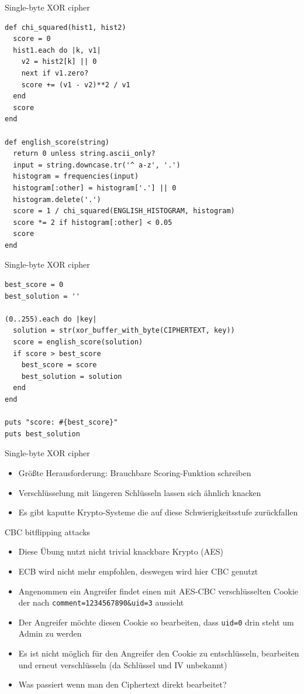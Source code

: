 \documentclass[presentation]{beamer}
\begin{document}
\begin{frame}[fragile,label={sec:org49881d1}]{Single-byte XOR cipher}
 \begin{verbatim}
def chi_squared(hist1, hist2)
  score = 0
  hist1.each do |k, v1|
    v2 = hist2[k] || 0
    next if v1.zero?
    score += (v1 - v2)**2 / v1
  end
  score
end

def english_score(string)
  return 0 unless string.ascii_only?
  input = string.downcase.tr('^ a-z', '.')
  histogram = frequencies(input)
  histogram[:other] = histogram['.'] || 0
  histogram.delete('.')
  score = 1 / chi_squared(ENGLISH_HISTOGRAM, histogram)
  score *= 2 if histogram[:other] < 0.05
  score
end
\end{verbatim}
\end{frame}

\begin{frame}[fragile,label={sec:org6af65bc}]{Single-byte XOR cipher}
 \begin{verbatim}
best_score = 0
best_solution = ''

(0..255).each do |key|
  solution = str(xor_buffer_with_byte(CIPHERTEXT, key))
  score = english_score(solution)
  if score > best_score
    best_score = score
    best_solution = solution
  end
end

puts "score: #{best_score}"
puts best_solution
\end{verbatim}
\end{frame}

\begin{frame}[label={sec:org4ad62f3}]{Single-byte XOR cipher}
\begin{itemize}
\item Größte Herausforderung: Brauchbare Scoring-Funktion schreiben
\item Verschlüsselung mit längeren Schlüsseln lassen sich ähnlich knacken
\item Es gibt kaputte Krypto-Systeme die auf diese Schwierigkeitsstufe
zurückfallen
\end{itemize}
\end{frame}

\begin{frame}[fragile,label={sec:org0458b8c}]{CBC bitflipping attacks}
 \begin{itemize}
\item Diese Übung nutzt nicht trivial knackbare Krypto (AES)
\item ECB wird nicht mehr empfohlen, deswegen wird hier CBC genutzt
\item Angenommen ein Angreifer findet einen mit AES-CBC verschlüsselten
Cookie der nach \texttt{comment=1234567890\&uid=3} aussieht
\item Der Angreifer möchte diesen Cookie so bearbeiten, dass \texttt{uid=0} drin
steht um Admin zu werden
\item Es ist nicht möglich für den Angreifer den Cookie zu entschlüsseln,
bearbeiten und erneut verschlüsseln (da Schlüssel und IV unbekannt)
\item Was passiert wenn man den Ciphertext direkt bearbeitet?
\end{itemize}
\end{frame}
\end{document}
